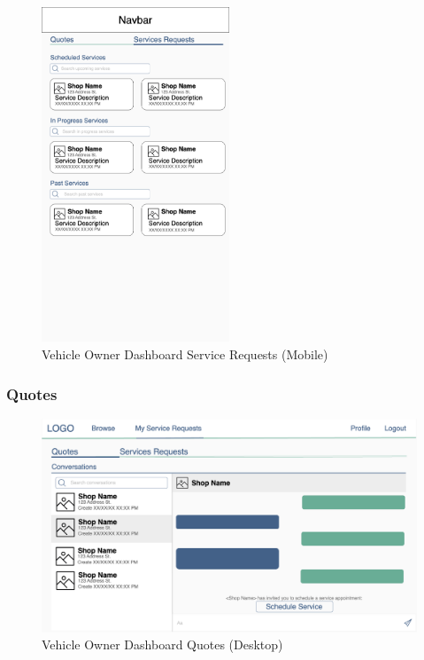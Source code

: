 \documentclass[12pt, titlepage]{article}
\begin{document}
\begin{figure}[H]
	\centering
	\includegraphics[width=0.5\textwidth]{mockups/Vehicle Owner Dashboard (Service Requests) (Mobile).png}
	\caption{Vehicle Owner Dashboard \textemdash{} Service Requests (Mobile)}
\end{figure}

\subsubsection{Quotes}

\begin{figure}[H]
	\centering
	\includegraphics[width=\textwidth]{mockups/Vehicle Owner Dashboard (Quotes) (Desktop).png}
	\caption{Vehicle Owner Dashboard \textemdash{} Quotes (Desktop)}
\end{figure}
\end{document}
